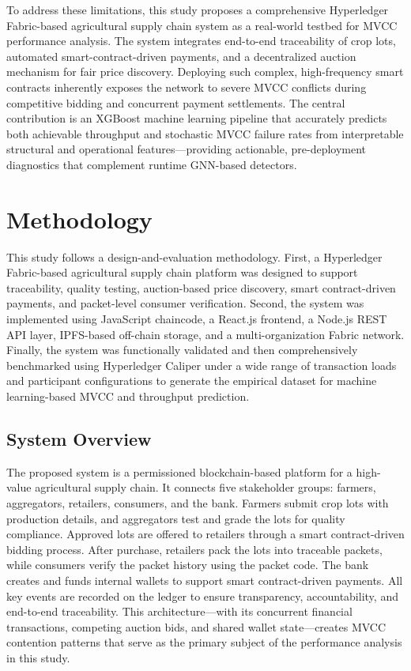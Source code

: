 \documentclass[manuscript,screen]{acmart}
\begin{document}
To address these limitations, this study proposes a comprehensive Hyperledger Fabric-based agricultural supply chain system as a real-world testbed for MVCC performance analysis. The system integrates end-to-end traceability of crop lots, automated smart-contract-driven payments, and a decentralized auction mechanism for fair price discovery. Deploying such complex, high-frequency smart contracts inherently exposes the network to severe MVCC conflicts during competitive bidding and concurrent payment settlements. The central contribution is an XGBoost machine learning pipeline that accurately predicts both achievable throughput and stochastic MVCC failure rates from interpretable structural and operational features---providing actionable, pre-deployment diagnostics that complement runtime GNN-based detectors.

\section{Methodology}
	
	This study follows a design-and-evaluation methodology. First, a Hyperledger Fabric-based agricultural supply chain platform was designed to support traceability, quality testing, auction-based price discovery, smart contract-driven payments, and packet-level consumer verification. Second, the system was implemented using JavaScript chaincode, a React.js frontend, a Node.js REST API layer, IPFS-based off-chain storage, and a multi-organization Fabric network. Finally, the system was functionally validated and then comprehensively benchmarked using Hyperledger Caliper under a wide range of transaction loads and participant configurations to generate the empirical dataset for machine learning-based MVCC and throughput prediction.
	
\subsection{System Overview}

The proposed system is a permissioned blockchain-based platform for a high-value agricultural supply chain. It connects five stakeholder groups: farmers, aggregators, retailers, consumers, and the bank. Farmers submit crop lots with production details, and aggregators test and grade the lots for quality compliance. Approved lots are offered to retailers through a smart contract-driven bidding process. After purchase, retailers pack the lots into traceable packets, while consumers verify the packet history using the packet code. The bank creates and funds internal wallets to support smart contract-driven payments. All key events are recorded on the ledger to ensure transparency, accountability, and end-to-end traceability. This architecture—with its concurrent financial transactions, competing auction bids, and shared wallet state—creates MVCC contention patterns that serve as the primary subject of the performance analysis in this study.
\end{document}

